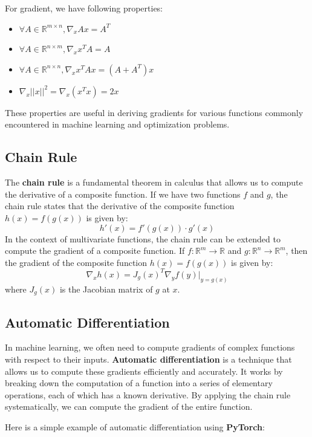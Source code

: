 For gradient, we have following properties:
\begin{itemize}
    \item \(\forall A \in \mathbb{R}^{m \times n}, \nabla_x A x = A^T\)
    \item \(\forall A \in \mathbb{R}^{n \times m}, \nabla_x x^T A = A\)
    \item \(\forall A \in \mathbb{R}^{n \times n}, \nabla_x x^T A x = (A + A^T) x\)
    \item \(\nabla_x ||x||^2 = \nabla_x (x^T x) = 2x\)
\end{itemize}

These properties are useful in deriving gradients for various functions commonly encountered in machine learning and optimization problems.

\subsection{Chain Rule}

The \textbf{chain rule} is a fundamental theorem in calculus that allows us to compute the derivative of a composite function. If we have two functions \(f\) and \(g\), the chain rule states that the derivative of the composite function \(h(x) = f(g(x))\) is given by:
\[
h'(x) = f'(g(x)) \cdot g'(x)
\]
In the context of multivariate functions, the chain rule can be extended to compute the gradient of a composite function. If \(f: \mathbb{R}^m \to \mathbb{R}\) and \(g: \mathbb{R}^n \to \mathbb{R}^m\), then the gradient of the composite function \(h(x) = f(g(x))\) is given by:
\[
\nabla_x h(x) = J_g(x)^T \nabla_y f(y) \big|_{y=g(x)}
\]
where \(J_g(x)\) is the Jacobian matrix of \(g\) at \(x\).

\subsection{Automatic Differentiation}

In machine learning, we often need to compute gradients of complex functions with respect to their inputs. \textbf{Automatic differentiation} is a technique that allows us to compute these gradients efficiently and accurately. It works by breaking down the computation of a function into a series of elementary operations, each of which has a known derivative. By applying the chain rule systematically, we can compute the gradient of the entire function.

Here is a simple example of automatic differentiation using \textbf{PyTorch}:

